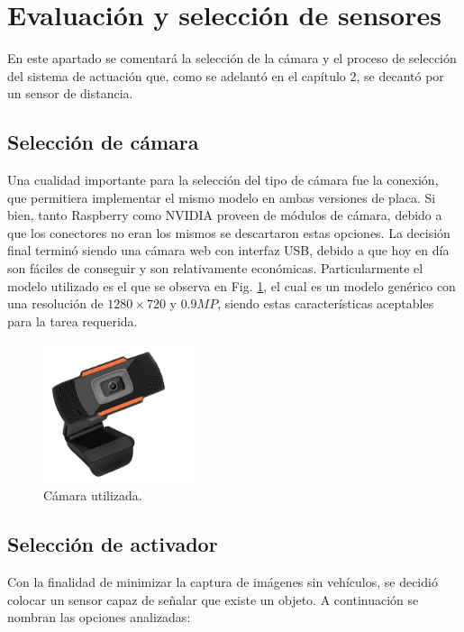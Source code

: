 \section{Evaluación y selección de sensores}

En este apartado se comentará la selección de la cámara y el proceso de selección del sistema de actuación que, como se adelantó en el capítulo 2, se decantó por un sensor de distancia.

\subsection{Selección de cámara}

Una cualidad importante para la selección del tipo de cámara fue la conexión, que permitiera implementar el mismo modelo en ambas versiones de placa.
Si bien, tanto Raspberry como NVIDIA proveen de módulos de cámara, debido a que los conectores no eran los mismos se descartaron estas opciones. La decisión final terminó siendo una cámara web con interfaz USB, debido a que hoy en día son fáciles de conseguir y son relativamente económicas. Particularmente el modelo utilizado es el que se observa en Fig. \ref{fig:camara-usb}, el cual es un modelo genérico con una resolución de $1280 \times 720$ y $0.9MP$, siendo estas características aceptables para la tarea requerida.

\begin{figure}[bth]
    \centering
    \includegraphics[width=0.4\textwidth]{imgs/camara-usb.jpg}
    \caption{Cámara utilizada.}
    \label{fig:camara-usb}
\end{figure}

\subsection{Selección de activador}

Con la finalidad de minimizar la captura de imágenes sin vehículos, se decidió colocar un sensor capaz de señalar que existe un objeto. A continuación se nombran las opciones analizadas:

